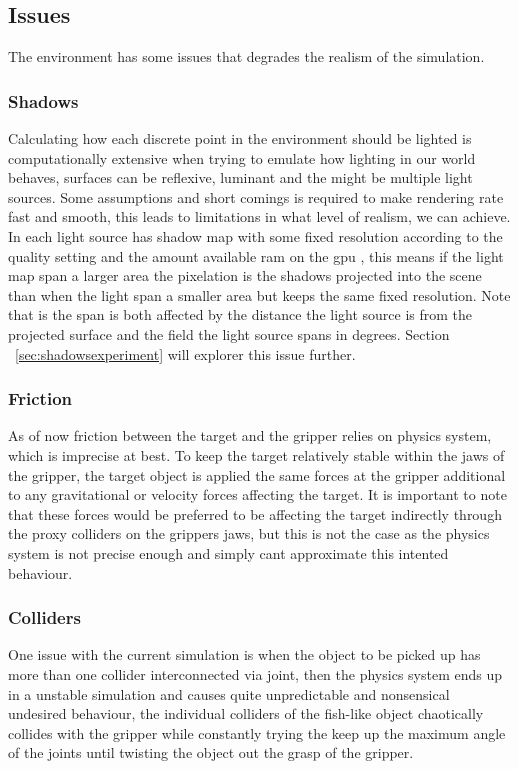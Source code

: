 \subsection{Issues}

The environment has some issues that degrades the realism of the simulation. 

\subsubsection{Shadows}

Calculating how each discrete point in the environment should be lighted is computationally extensive when trying to emulate how lighting in our world behaves, surfaces can be reflexive, luminant and the might be multiple light sources. Some assumptions and short comings is required to make rendering rate fast and smooth, this leads to limitations in what level of realism, we can achieve. In \cite{unity3d} each light source has shadow map with some fixed resolution according to the quality setting and the amount available ram on the gpu \cite{unityshadowmapsize}, this means if the light map span a larger area the pixelation is the shadows projected into the scene than when the light span a smaller area but keeps the same fixed resolution. Note that is the span is both affected by the distance the light source is from the projected surface and the field the light source spans in degrees. Section ~\ref{sec:shadowsexperiment} will explorer this issue further.

\subsubsection{Friction}

As of now friction between the target and the gripper relies on \cite{unityphysics} physics system, which is imprecise at best. To keep the target relatively stable within the jaws of the gripper, the target object is applied the same forces at the gripper additional to any gravitational or velocity forces affecting the target. It is important to note that these forces would be preferred to be affecting the target indirectly through the proxy colliders on the grippers jaws, but this is not the case as the \cite{unity3d} physics system is not precise enough and simply cant approximate this intented behaviour.

\subsubsection{Colliders}

One issue with the current simulation is when the object to be picked up has more than one collider interconnected via joint, then the \cite{unityphysics} physics system ends up in a unstable simulation and causes quite unpredictable and nonsensical undesired behaviour, the individual colliders of the fish-like object chaotically collides with the gripper while constantly trying the keep up the maximum angle of the joints until twisting the object out the grasp of the gripper.